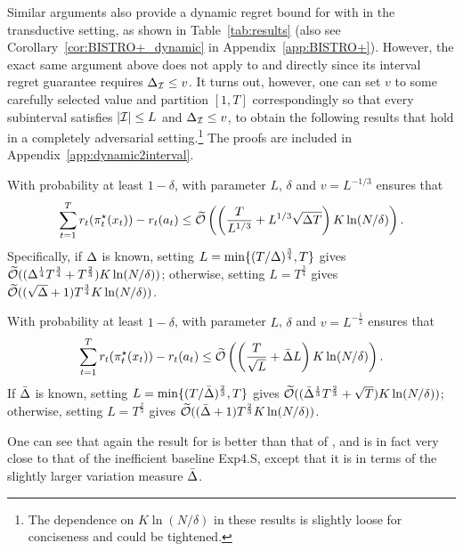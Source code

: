 Similar arguments also provide a dynamic regret bound for \corral with \bistro in the transductive setting,
as shown in Table~\ref{tab:results} (also see Corollary~\ref{cor:BISTRO+_dynamic} in Appendix~\ref{app:BISTRO+}).
However, the exact same argument above does not apply to \AdaEG and \AdaILTCB
directly since its interval regret guarantee requires $\Delta_{\mathcal{I}} \leq
v$.  
It turns out, however, one can set $v$ to some carefully selected value and
partition $[1,T]$ correspondingly so that every subinterval satisfies $|{\mathcal{I}}| \leq L$
and $\Delta_{\mathcal{I}} \leq v$,
to obtain the following results
that hold in a completely adversarial setting.\footnote{The dependence on
  $K\ln(N/\delta)$ in these results is slightly loose for conciseness and could be tightened.}
  The proofs are included in Appendix~\ref{app:dynamic2interval}.

\begin{cor}
\label{cor:dynamic AdaEG}
With probability at least $1 - \delta$, \AdaEG with parameter $L$, $\delta$ and
$v = L^{-1/3}$ ensures that
\[
\sum_{t=1}^T r_t(\pi_t^\star(x_t)) - r_t(a_t) \leq
\widetilde{\mathcal{O}}\left(\left(  \frac{T}{L^{1/3}} + L^{1/3}\sqrt{\Delta T}
\right)K\ln(N/\delta)\right).
\]
Specifically, if $\Delta$ is known, setting $L =
\min\{(T/\Delta)^\frac{3}{4}, T\}$ gives
$\widetilde{\mathcal{O}}((\Delta^\frac{1}{4}T^\frac{3}{4} +
T^\frac{2}{3})K\ln(N/\delta))$; otherwise, setting $L = T^\frac{3}{4}$
gives $\widetilde{\mathcal{O}}((\sqrt{\Delta}+1)T^\frac{3}{4} K\ln(N/\delta))$.
\end{cor}


\begin{cor}
\label{cor:dynamic AdaILTCB}
With probability at least $1 - \delta$, \AdaILTCB with parameter $L$, $\delta$ and
$v = L^{-\frac{1}{2}} $ ensures that
\[
\sum_{t=1}^T r_t(\pi_t^\star(x_t)) - r_t(a_t) \leq
\widetilde{\mathcal{O}}\left(\left(\frac{T}{\sqrt{L}} + \bar{\Delta} L
\right)K\ln(N/\delta)\right).
\]
If $\bar{\Delta}$ is known, setting $L =
\min\{(T/\bar{\Delta})^\frac{2}{3}, T\}$ gives
$\widetilde{\mathcal{O}}((\bar{\Delta}^\frac{1}{3} T^\frac{2}{3} +\sqrt{T})K\ln(N/\delta))$; otherwise, setting $L = T^\frac{2}{3}$
gives $\widetilde{\mathcal{O}}((\bar{\Delta}+1) T^\frac{2}{3} K\ln(N/\delta))$.
\end{cor}

One can see that again the result for \AdaILTCB is better than that of \AdaEG,
and is in fact very close to that of the inefficient baseline Exp4.S,
except that it is in terms of the slightly larger variation measure $\bar{\Delta}$.

